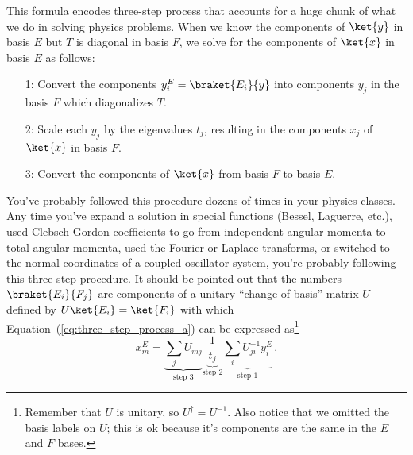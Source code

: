 This formula encodes three-step process that accounts for a huge chunk of what we do in solving physics problems.
When we know the components of $\ket{y}$ in basis $E$ but $T$ is diagonal in basis $F$, we solve for the components of $\ket{x}$ in basis $E$ as follows:
\begin{itemize}
  \item[1:] Convert the components $y^E_i = \braket{E_i}{y}$ into components $y_j$ in the basis $F$ which diagonalizes $T$.
  \item[2:] Scale each $y_j$ by the eigenvalues $t_j$, resulting in the components $x_j$ of $\ket{x}$ in basis $F$.
  \item[3:] Convert the components of $\ket{x}$ from basis $F$ to basis $E$.
\end{itemize}
You've probably followed this procedure dozens of times in your physics classes.
Any time you've expand a solution in special functions (Bessel, Laguerre, etc.), used Clebsch-Gordon coefficients to go from independent angular momenta to total angular momenta, used the Fourier or Laplace transforms, or switched to the normal coordinates of a coupled oscillator system, you're probably following this three-step procedure.
It should be pointed out that the numbers $\braket{E_i}{F_j}$ are components of a unitary ``change of basis'' matrix $U$ defined by $U \ket{E_i} = \ket{F_i}$ with which Equation~(\ref{eq:three_step_process_a}) can be expressed as\footnote{Remember that $U$ is unitary, so $U^\dagger = U^{-1}$. Also notice that we omitted the basis labels on $U$; this is ok because it's components are the same in the $E$ and $F$ bases.}
\begin{equation}
  x^E_m
  =
    \underbrace{\sum_j U_{mj}}_\text{step 3}
    \underbrace{\frac{1}{t_j}}_\text{step 2}
    \underbrace{\sum_i U^{-1}_{ji} y^E_i}_\text{step 1}
    \, .
\end{equation}

